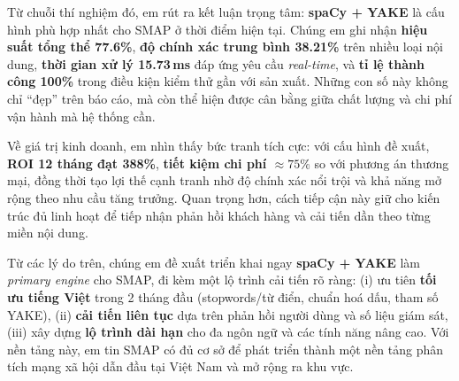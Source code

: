 Từ chuỗi thí nghiệm đó, em rút ra kết luận trọng tâm: \textbf{spaCy + YAKE} là cấu hình phù hợp nhất cho SMAP ở thời điểm hiện tại. Chúng em ghi nhận \textbf{hiệu suất tổng thể 77.6\%}, \textbf{độ chính xác trung bình 38.21\%} trên nhiều loại nội dung, \textbf{thời gian xử lý 15.73\,ms} đáp ứng yêu cầu \emph{real-time}, và \textbf{tỉ lệ thành công 100\%} trong điều kiện kiểm thử gần với sản xuất. Những con số này không chỉ “đẹp” trên báo cáo, mà còn thể hiện được cân bằng giữa chất lượng và chi phí vận hành mà hệ thống cần.

Về giá trị kinh doanh, em nhìn thấy bức tranh tích cực: với cấu hình đề xuất, \textbf{ROI 12 tháng đạt 388\%}, \textbf{tiết kiệm chi phí \(\approx 75\%\)} so với phương án thương mại, đồng thời tạo lợi thế cạnh tranh nhờ độ chính xác nổi trội và khả năng mở rộng theo nhu cầu tăng trưởng. Quan trọng hơn, cách tiếp cận này giữ cho kiến trúc đủ linh hoạt để tiếp nhận phản hồi khách hàng và cải tiến dần theo từng miền nội dung.

Từ các lý do trên, chúng em đề xuất triển khai ngay \textbf{spaCy + YAKE} làm \emph{primary engine} cho SMAP, đi kèm một lộ trình cải tiến rõ ràng: (i) ưu tiên \textbf{tối ưu tiếng Việt} trong 2 tháng đầu (stopwords/từ điển, chuẩn hoá dấu, tham số YAKE), (ii) \textbf{cải tiến liên tục} dựa trên phản hồi người dùng và số liệu giám sát, (iii) xây dựng \textbf{lộ trình dài hạn} cho đa ngôn ngữ và các tính năng nâng cao. Với nền tảng này, em tin SMAP có đủ cơ sở để phát triển thành một nền tảng phân tích mạng xã hội dẫn đầu tại Việt Nam và mở rộng ra khu vực.
